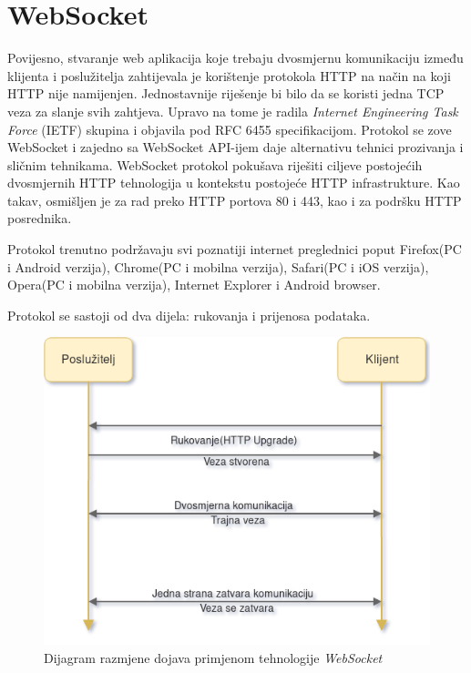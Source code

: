\documentclass[times, utf8, zavrsni]{fer}
\begin{document}
\section{WebSocket}
Povijesno, stvaranje web aplikacija koje trebaju dvosmjernu komunikaciju između klijenta i poslužitelja zahtijevala je korištenje protokola HTTP na način na koji HTTP nije namijenjen. Jednostavnije riješenje bi bilo da se koristi jedna TCP veza za slanje svih zahtjeva. Upravo na tome je radila {\em Internet Engineering Task Force} (IETF) skupina i objavila pod RFC 6455 specifikacijom. Protokol se zove WebSocket i zajedno sa WebSocket API-ijem daje alternativu tehnici prozivanja i sličnim tehnikama. WebSocket protokol pokušava riješiti ciljeve postojećih dvosmjernih HTTP tehnologija u kontekstu postojeće HTTP infrastrukture. Kao takav, osmišljen je za rad preko HTTP portova 80 i 443, kao i za podršku HTTP posrednika.

Protokol trenutno podržavaju svi poznatiji internet preglednici poput Firefox(PC i Android verzija), Chrome(PC i mobilna verzija), Safari(PC i iOS verzija), Opera(PC i mobilna verzija), Internet Explorer i Android browser.

Protokol se sastoji od dva dijela: rukovanja i prijenosa podataka. \citep{rfc6455}

\begin{figure}[htb]
\centering
\includegraphics[width=14cm]{img/websocket.png}
\caption{Dijagram razmjene dojava primjenom tehnologije {\em WebSocket}}
\label{fig:websocket-image}
\end{figure}
\end{document}
